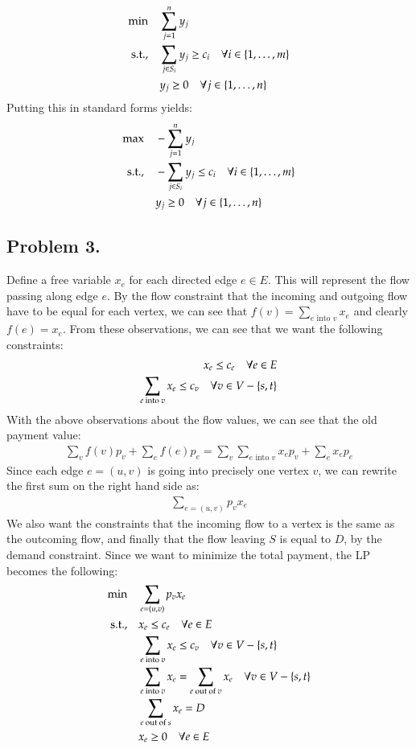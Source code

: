 \documentclass[12pt]{article}
\theoremstyle{definitionstyle}
\newcommand{\SET}[1]{\Set{\mskip-\medmuskip #1 \mskip-\medmuskip}}
\begin{document}
    \begin{align*}
        \min \quad &\sum_{j=1}^n y_j \\
        \text{s.t.,} \quad &\sum_{j \in S_i} y_j \geq c_i \quad \forall i \in \SET{1, \ldots, m} \\
        &y_j \geq 0 \quad \forall j \in \SET{1, \ldots, n}
    \end{align*}
    Putting this in standard forms yields:
    \begin{align*}
        \max \quad &-\sum_{j=1}^n y_j \\
        \text{s.t.,} \quad &-\sum_{j \in S_i} y_j \leq c_i \quad \forall i \in \SET{1, \ldots, m} \\
        &y_j \geq 0 \quad \forall j \in \SET{1, \ldots, n}
    \end{align*}



    \subsection*{Problem 3.}
    Define a free variable $x_e$ for each directed edge $e \in E$. This will represent the flow passing along edge $e$. By the flow constraint that the incoming and outgoing flow have to be equal for each vertex, we can see that $f(v) = \sum_{e \text{ into } v} x_e$ and clearly $f(e) = x_e$. From these observations, we can see that we want the following constraints:
    \begin{align*}
        x_e \leq c_e \quad \forall e \in E \\
        \sum_{e \text{ into } v} x_e \leq c_v \quad \forall v \in V - \SET{s, t}
    \end{align*}
    With the above observations about the flow values, we can see that the old payment value:
    \begin{align*}
        \sum_v f(v)p_v + \sum_e f(e)p_e = \sum_v \sum_{e \text{ into } v} x_ep_v + \sum_e x_ep_e
    \end{align*}
    Since each edge $e = (u,v)$ is going into precisely one vertex $v$, we can rewrite the first sum on the right hand side as:
    \begin{align*}
        \sum_{e = (u,v)} p_vx_e
    \end{align*}
    We also want the constraints that the incoming flow to a vertex is the same as the outcoming flow, and finally that the flow leaving $S$ is equal to $D$, by the demand constraint. Since we want to minimize the total payment, the LP becomes the following:
    \begin{align*}
        \min \quad &\sum_{e = (u,v)} p_vx_e \\
        \text{s.t.,} \quad &x_e \leq c_e \quad \forall e \in E \\
        &\sum_{e \text{ into } v} x_e \leq c_v \quad \forall v \in V - \SET{s, t} \\
        &\sum_{e \text{ into } v} x_e = \sum_{e \text{ out of } v} x_e \quad \forall v \in V - \SET{s, t}\\
        &\sum_{e \text{ out of } s} x_e = D \\
        &x_e \geq 0 \quad \forall e \in E
    \end{align*}
    
\end{document}

